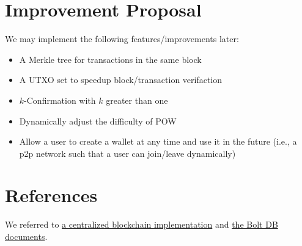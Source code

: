 \documentclass[10pt]{homework}
\begin{document}
\section{\textbf{Improvement Proposal}}

We may implement the following features/improvements later:
\begin{itemize}
  \item A Merkle tree for transactions in the same block
  \item A UTXO set to speedup block/transaction verifaction
  \item $k$-Confirmation with $k$ greater than one
  \item Dynamically adjust the difficulty of POW
  \item Allow a user to create a wallet at any time and use it in the future (i.e., a p2p network such that a user can join/leave dynamically)
\end{itemize}

\section{\textbf{References}}

We referred to \href{https://github.com/Jeiwan/blockchain_go/tree/master}{a centralized blockchain implementation} and \href{https://pkg.go.dev/github.com/boltdb/bolt}{the Bolt DB documents}.
\end{document}
